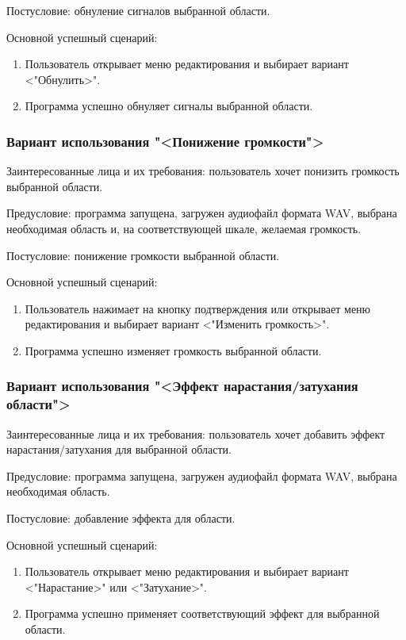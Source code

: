 Постусловие: обнуление сигналов выбранной области.

Основной успешный сценарий:
\begin{enumerate}
	\item Пользователь открывает меню редактирования и выбирает вариант <"Обнулить>".
	\item Программа успешно обнуляет сигналы выбранной области.
\end{enumerate} 

\subsubsection{Вариант использования "<Понижение громкости">}

Заинтересованные лица и их требования: пользователь хочет понизить громкость выбранной области.

Предусловие: программа запущена, загружен аудиофайл формата WAV, выбрана необходимая область и, на соответствующей шкале, желаемая громкость.

Постусловие: понижение громкости выбранной области.

Основной успешный сценарий:
\begin{enumerate}
	\item Пользователь нажимает на кнопку подтверждения или открывает меню редактирования и выбирает вариант <"Изменить громкость>".
	\item Программа успешно изменяет громкость выбранной области.
\end{enumerate} 

\subsubsection{Вариант использования "<Эффект нарастания/затухания области">}

Заинтересованные лица и их требования: пользователь хочет добавить эффект нарастания/затухания для выбранной области.

Предусловие: программа запущена, загружен аудиофайл формата WAV, выбрана необходимая область.

Постусловие: добавление эффекта для области.

Основной успешный сценарий:
\begin{enumerate}
	\item Пользователь открывает меню редактирования и выбирает вариант <"Нарастание>" или <"Затухание>".
	\item Программа успешно применяет соответствующий эффект для выбранной области.
\end{enumerate} 

